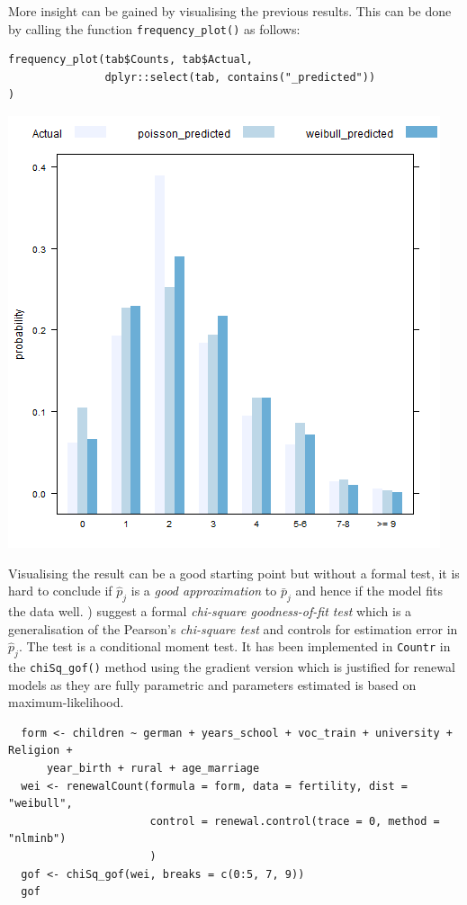 \documentclass[a4paper,twoside,11pt]{article}
\begin{document}
More insight can be gained by visualising the previous results. This can be done
by calling the function \texttt{frequency\_plot()} as follows:
\begin{verbatim}
frequency_plot(tab$Counts, tab$Actual,
               dplyr::select(tab, contains("_predicted"))
)
\end{verbatim}

\begin{center}
\includegraphics[width=.9\linewidth]{hist.png}
\end{center}



Visualising the result can be a good starting point but without a formal test,
it is hard to conclude if \(\hat{p}_j\) is a \emph{good approximation} to \(\bar{p}_j\)
and hence if the model fits the data well. \citet[Section 5.3.4]{cameron2013regression})
suggest a formal \emph{chi-square goodness-of-fit
test} which is a generalisation of the Pearson's \emph{chi-square test} and controls
for estimation error in \(\hat{p}_j\). The test is a conditional moment test. It
has been implemented in \texttt{Countr} in the \texttt{chiSq\_gof()} method using the gradient
version which is justified for renewal models as they are fully parametric and
parameters estimated is based on maximum-likelihood.

\begin{verbatim}
  form <- children ~ german + years_school + voc_train + university + Religion +
      year_birth + rural + age_marriage
  wei <- renewalCount(formula = form, data = fertility, dist = "weibull",
                      control = renewal.control(trace = 0, method = "nlminb")
                      )
  gof <- chiSq_gof(wei, breaks = c(0:5, 7, 9))
  gof
\end{verbatim}
\end{document}
